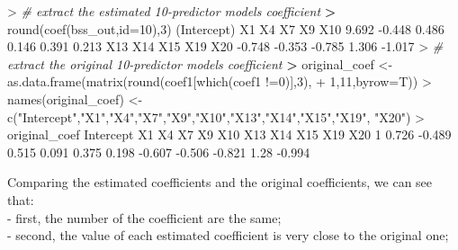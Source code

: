 \documentclass[
]{article}
\newenvironment{Shaded}{\begin{snugshade}}{\end{snugshade}}
\newcommand{\AttributeTok}[1]{\textcolor[rgb]{0.77,0.63,0.00}{#1}}
\newcommand{\CommentTok}[1]{\textcolor[rgb]{0.56,0.35,0.01}{\textit{#1}}}
\newcommand{\DecValTok}[1]{\textcolor[rgb]{0.00,0.00,0.81}{#1}}
\newcommand{\ErrorTok}[1]{\textcolor[rgb]{0.64,0.00,0.00}{\textbf{#1}}}
\newcommand{\FloatTok}[1]{\textcolor[rgb]{0.00,0.00,0.81}{#1}}
\newcommand{\FunctionTok}[1]{\textcolor[rgb]{0.00,0.00,0.00}{#1}}
\newcommand{\NormalTok}[1]{#1}
\newcommand{\OtherTok}[1]{\textcolor[rgb]{0.56,0.35,0.01}{#1}}
\newcommand{\SpecialCharTok}[1]{\textcolor[rgb]{0.00,0.00,0.00}{#1}}
\newcommand{\StringTok}[1]{\textcolor[rgb]{0.31,0.60,0.02}{#1}}
\begin{document}
\begin{Shaded}
\begin{Highlighting}[]
\SpecialCharTok{\textgreater{}} \CommentTok{\# extract the estimated 10{-}predictor model\textquotesingle{}s coefficient}
\ErrorTok{\textgreater{}} \FunctionTok{round}\NormalTok{(}\FunctionTok{coef}\NormalTok{(bss\_out,}\AttributeTok{id=}\DecValTok{10}\NormalTok{),}\DecValTok{3}\NormalTok{)}
\NormalTok{(Intercept)          X1          X4          X7          X9         X10 }
      \FloatTok{9.692}      \SpecialCharTok{{-}}\FloatTok{0.448}       \FloatTok{0.486}       \FloatTok{0.146}       \FloatTok{0.391}       \FloatTok{0.213} 
\NormalTok{        X13         X14         X15         X19         X20 }
     \SpecialCharTok{{-}}\FloatTok{0.748}      \SpecialCharTok{{-}}\FloatTok{0.353}      \SpecialCharTok{{-}}\FloatTok{0.785}       \FloatTok{1.306}      \SpecialCharTok{{-}}\FloatTok{1.017} 
\SpecialCharTok{\textgreater{}} \CommentTok{\# extract the original 10{-}predictor model\textquotesingle{}s coefficient}
\ErrorTok{\textgreater{}}\NormalTok{ original\_coef }\OtherTok{\textless{}{-}} \FunctionTok{as.data.frame}\NormalTok{(}\FunctionTok{matrix}\NormalTok{(}\FunctionTok{round}\NormalTok{(coef1[}\FunctionTok{which}\NormalTok{(coef1 }\SpecialCharTok{!=}\DecValTok{0}\NormalTok{)],}\DecValTok{3}\NormalTok{),}
\SpecialCharTok{+}                                       \DecValTok{1}\NormalTok{,}\DecValTok{11}\NormalTok{,}\AttributeTok{byrow=}\NormalTok{T))}
\SpecialCharTok{\textgreater{}} \FunctionTok{names}\NormalTok{(original\_coef) }\OtherTok{\textless{}{-}} \FunctionTok{c}\NormalTok{(}\StringTok{"Intercept"}\NormalTok{,}\StringTok{"X1"}\NormalTok{,}\StringTok{"X4"}\NormalTok{,}\StringTok{"X7"}\NormalTok{,}\StringTok{"X9"}\NormalTok{,}\StringTok{"X10"}\NormalTok{,}\StringTok{"X13"}\NormalTok{,}\StringTok{"X14"}\NormalTok{,}\StringTok{"X15"}\NormalTok{,}\StringTok{"X19"}\NormalTok{, }\StringTok{"X20"}\NormalTok{)}
\SpecialCharTok{\textgreater{}}\NormalTok{ original\_coef}
\NormalTok{  Intercept     X1    X4    X7    X9   X10    X13    X14    X15  X19    X20}
\DecValTok{1}     \FloatTok{0.726} \SpecialCharTok{{-}}\FloatTok{0.489} \FloatTok{0.515} \FloatTok{0.091} \FloatTok{0.375} \FloatTok{0.198} \SpecialCharTok{{-}}\FloatTok{0.607} \SpecialCharTok{{-}}\FloatTok{0.506} \SpecialCharTok{{-}}\FloatTok{0.821} \FloatTok{1.28} \SpecialCharTok{{-}}\FloatTok{0.994}
\end{Highlighting}
\end{Shaded}

Comparing the estimated coefficients and the original coefficients, we
can see that:\\
- first, the number of the coefficient are the same;\\
- second, the value of each estimated coefficient is very close to the
original one;
\end{document}
